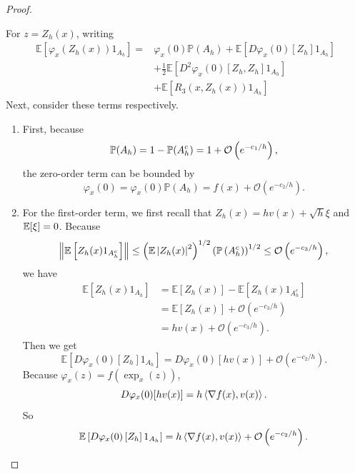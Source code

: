 \begin{proof}
\begin{enumerate}[label=\Roman{*}.]
        For $z = Z_h(x)$, writing
        \begin{align*}
            \mathbb{E}\left[\varphi_x\left(Z_h(x)\right) 1_{A_h}\right]= & \varphi_x(0) \mathbb{P}\left(A_h\right)+\mathbb{E}\left[D \varphi_x(0)\left[Z_h\right] 1_{A_h}\right] \\
            & +\frac{1}{2} \mathbb{E}\left[D^2 \varphi_x(0)\left[Z_h, Z_h\right] 1_{A_h}\right] \\
            & +\mathbb{E}\left[R_3(x,Z_h(x)) 1_{A_h}\right] 
        \end{align*}
        Next, consider these terms respectively.
        \begin{enumerate}[label=(\alph{*})]
            \item First, because
            \begin{equation*}
                \mathbb{P}(A_h) = 1 - \mathbb{P}(A_h^c) = 1 + \mathcal{O}\left(e^{-c_1/h}\right),
            \end{equation*}
            the zero-order term can be bounded by
            \begin{equation*}
                \varphi_x(0) = \varphi_x(0) \mathbb{P}\left(A_h\right)=f(x)+\mathcal{O}\left(e^{-c_2 / h}\right) .
            \end{equation*}
            \item For the first-order term, we first recall that $Z_h(x)=h v(x)+\sqrt{h} \xi$ and $\mathbb{E}[\xi] = 0$. Because
            \begin{equation*}
               \left\lVert\mathbb{E}\left[Z_h(x) 1_{A^c_h}\right]\right\lVert \leq \left(\mathbb{E}\left|Z_h(x)\right|^2\right)^{1 / 2}\left(\mathbb{P}\left(A_h^c\right)\right)^{1 / 2} \leq \mathcal{O}\left(e^{-c_3 / h}\right),
            \end{equation*}
            we have
            \begin{align*}
                \mathbb{E}\left[Z_h(x) 1_{A_h}\right] &= \mathbb{E}\left[Z_h(x)\right] - \mathbb{E}\left[Z_h(x) 1_{A^c_h}\right] \\
                &=\mathbb{E}\left[Z_h(x)\right]+\mathcal{O}\left(e^{-c_3 / h}\right) \\
                &=h v(x)+\mathcal{O}\left(e^{-c_3 / h}\right).
            \end{align*}
            Then we get
            \begin{equation*}
                \mathbb{E}\left[D \varphi_x(0)\left[Z_h\right] 1_{A_h}\right]=D \varphi_x(0)[h v(x)]+\mathcal{O}\left(e^{-c_2 / h}\right).
            \end{equation*}
            Because $\varphi_x(z) = f(\exp_x(z))$,
            \begin{equation*}
                D \varphi_x(0)[h v(x)] = h\left\langle \nabla f(x), v(x) \right\rangle.
            \end{equation*}
            So
            \begin{equation*}
                \mathbb{E}\left[D \varphi_x(0)\left[Z_h\right] 1_{A_h}\right]= h\left\langle \nabla f(x), v(x) \right\rangle + \mathcal{O}\left(e^{-c_2 / h}\right).
            \end{equation*}


\end{enumerate}
\end{enumerate}
\end{proof}
